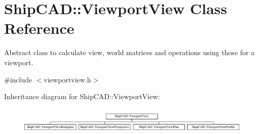 \hypertarget{classShipCAD_1_1ViewportView}{\section{Ship\-C\-A\-D\-:\-:Viewport\-View Class Reference}
\label{classShipCAD_1_1ViewportView}
}


Abstract class to calculate view, world matrices and operations using those for a viewport.  




{\ttfamily \#include $<$viewportview.\-h$>$}

Inheritance diagram for Ship\-C\-A\-D\-:\-:Viewport\-View\-:\begin{figure}[H]
\begin{center}
\leavevmode
\includegraphics[height=1.255605cm]{classShipCAD_1_1ViewportView}
\end{center}
\end{figure}
